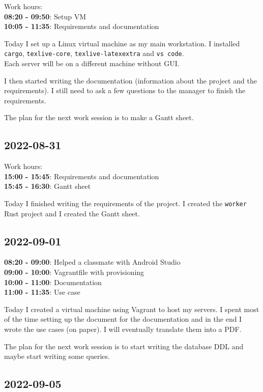 \documentclass{article}
\begin{document}
Work hours:\\
\textbf{08:20 - 09:50}: Setup VM
\\
\textbf{10:05 - 11:35}: Requirements and documentation

Today I set up a Linux virtual machine as my main workstation.
I installed \texttt{cargo}, \texttt{texlive-core}, \texttt{texlive-latexextra} and
\texttt{vs code}.
\\
Each server will be on a different machine without GUI.

I then started writing the documentation (information about the project
and the requirements). I still need to ask a few questions to the manager
to finish the requirements.

The plan for the next work session is to make a Gantt sheet.

\subsection{2022-08-31}

Work hours:\\
\textbf{15:00 - 15:45}: Requirements and documentation
\\
\textbf{15:45 - 16:30}: Gantt sheet

Today I finished writing the requirements of the project. I created the \texttt{worker}
Rust project and I created the Gantt sheet.

\pagebreak

\subsection{2022-09-01}

\textbf{08:20 - 09:00}: Helped a classmate with Android Studio \\
\textbf{09:00 - 10:00}: Vagrantfile with provisioning \\
\textbf{10:00 - 11:00}: Documentation \\
\textbf{11:00 - 11:35}: Use case

Today I created a virtual machine using
Vagrant to host my servers.
I spent most of the time
setting up the document for the documentation
and in the end I wrote the use cases (on paper).
I will eventually translate them into a PDF.

The plan for the next work session is to start writing the database DDL
and maybe start writing some queries.

\subsection{2022-09-05}
\end{document}
